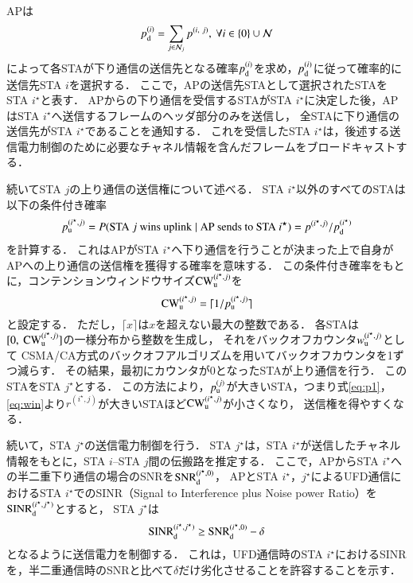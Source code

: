 \documentclass[technicalreport]{ieicej}
\begin{document}
		APは
		\begin{equation}
			p_{\rm d}^{(i)}= \sum_{j\in{\mathcal N}_j}p^{(i,\ j)},\ \forall i \in \{0\}\cup{\mathcal N}
		\end{equation}
		によって各STAが下り通信の送信先となる確率$p_{\rm d}^{(i)}$を求め，$p_{\rm d}^{(i)}$に従って確率的に送信先STA $i$を選択する．
		ここで，APの送信先STAとして選択されたSTAをSTA $i^{\star}$と表す．
		APからの下り通信を受信するSTAがSTA $i^{\star}$に決定した後，APはSTA $i^{\star}$へ送信するフレームのヘッダ部分のみを送信し，
		全STAに下り通信の送信先がSTA $i^{\star}$であることを通知する．
		これを受信したSTA $i^{\star}$は，後述する送信電力制御のために必要なチャネル情報を含んだフレームをブロードキャストする．
		\par
		続いてSTA $j$の上り通信の送信権について述べる．
		STA $i^{\star}$以外のすべてのSTAは以下の条件付き確率
		\begin{equation}
			p_{\rm u}^{(i^{\star},j)} = P({\rm STA}\ j\ {\rm wins\ uplink}\mid{\rm AP\ sends\ to}\ {\rm STA}\ i^{\star})=p^{(i^{\star},j)} / p_{\rm d}^{(i^{\star})} \label{eq:win}
		\end{equation}
		を計算する．
		これはAPがSTA $i^{\star}$へ下り通信を行うことが決まった上で自身がAPへの上り通信の送信権を獲得する確率を意味する．
		この条件付き確率をもとに，コンテンションウィンドウサイズ${\rm CW}^{(i^{\star},j)}_{\rm u}$を
		\begin{equation}
			{\rm CW}^{(i^{\star},j)}_{\rm u} = \lceil 1/p_{\rm u}^{(i^{\star},j)} \rceil
		\end{equation}
		と設定する．
		ただし，$\lceil x \rceil$は$x$を超えない最大の整数である．
		各STAは$[0,\ {\rm CW}^{(i^{\star},j)}_{\rm u}]$の一様分布から整数を生成し，
		それをバックオフカウンタ$w_{\rm u}^{(i^{\star},j)}$として
		CSMA/CA方式のバックオフアルゴリズムを用いてバックオフカウンタを1ずつ減らす．
		その結果，最初にカウンタが0となったSTAが上り通信を行う．
		このSTAをSTA $j^{\star}$とする．
		この方法により，$p_{\rm u}^{(j)}$が大きいSTA，つまり式\eqref{eq:p1}，\eqref{eq:win}より$r^{(i^{\star},j)}$が大きいSTAほど${\rm CW}^{(i^{\star},j)}_{\rm u}$が小さくなり，
		送信権を得やすくなる．
		\par
		続いて，STA $j^{\star}$の送信電力制御を行う．
		STA $j^{\star}$は，STA $i^{\star}$が送信したチャネル情報をもとに，STA $i$--STA $j$間の伝搬路を推定する．
		ここで，APからSTA $i^{\star}$への半二重下り通信の場合のSNRを${\rm SNR}_{\rm d}^{(i^{\star},0)}$，
		APとSTA $i^{\star}$，$j^{\star}$によるUFD通信におけるSTA $i^{\star}$でのSINR（Signal to Interference plus Noise power Ratio）を${\rm SINR}_{\rm d}^{(i^{\star},j^{\star})}$とすると，
		STA $j^{\star}$は
		\begin{equation}
			{\rm SINR}_{\rm d}^{(i^{\star},j^{\star})} \geq {\rm SNR}_{\rm d}^{(i^{\star},0)} -\delta
		\end{equation}
		となるように送信電力を制御する．
		これは，UFD通信時のSTA $i^{\star}$におけるSINRを，半二重通信時のSNRと比べて$\delta$だけ劣化させることを許容することを示す．
\end{document}
